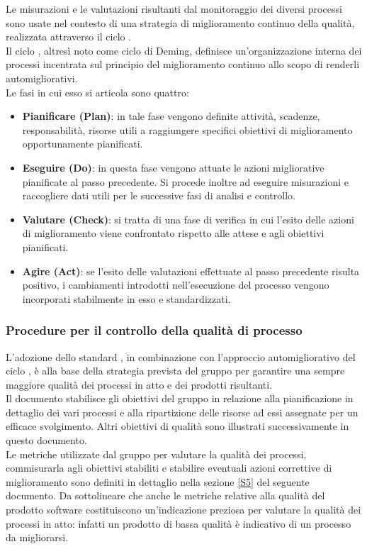	Le misurazioni e le valutazioni risultanti dal monitoraggio dei diversi processi sono usate nel contesto di una strategia di miglioramento continuo della qualità, realizzata attraverso il ciclo .
	\\Il ciclo , altresì noto come ciclo di Deming, definisce un'organizzazione interna dei processi incentrata sul principio del miglioramento continuo allo scopo di renderli automigliorativi.
	\\Le fasi in cui esso si articola sono quattro:
		\begin{itemize}
			\item \textbf{Pianificare (Plan)}: in tale fase vengono definite attività, scadenze, responsabilità, risorse utili a raggiungere specifici obiettivi di miglioramento opportunamente pianificati.
			\item \textbf{Eseguire (Do)}: in questa fase vengono attuate le azioni migliorative pianificate al passo precedente. Si procede inoltre ad eseguire misurazioni e raccogliere dati utili per le successive fasi di analisi e controllo.
			\item \textbf{Valutare (Check)}: si tratta di una fase di verifica in cui l'esito delle azioni di miglioramento viene confrontato rispetto alle attese e agli obiettivi pianificati.
			\item \textbf{Agire (Act)}: se l'esito delle valutazioni effettuate al passo precedente risulta positivo, i cambiamenti introdotti nell'esecuzione del processo vengono incorporati stabilmente in esso e standardizzati.
		\end{itemize}

		\subsubsection{Procedure per il controllo della qualità di processo}
		L'adozione dello standard , in combinazione con l'approccio automigliorativo del ciclo , è alla base della strategia prevista del gruppo per garantire una sempre maggiore qualità dei processi in atto e dei prodotti risultanti.
		\\Il documento \PdP{} stabilisce gli obiettivi del gruppo in relazione alla pianificazione in dettaglio dei vari processi e alla ripartizione delle risorse ad essi assegnate per un efficace svolgimento. Altri obiettivi di qualità sono illustrati successivamente in questo documento.
		\\Le metriche utilizzate dal gruppo per valutare la qualità dei processi, commisurarla agli obiettivi stabiliti e stabilire eventuali azioni correttive di miglioramento sono definiti in dettaglio nella sezione \ref{S5} del seguente documento. Da sottolineare che anche le metriche relative alla qualità del prodotto software costituiscono un'indicazione preziosa per valutare la qualità dei processi in atto: infatti un prodotto di bassa qualità è indicativo di un processo da migliorarsi.

